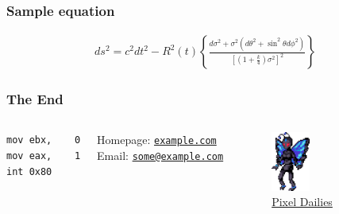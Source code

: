 \documentclass[10pt]{beamer}
\begin{document}
\begin{frame}
\frametitle{Sample equation}
\begin{gather}\label{eq:1}
ds^2=c^2dt^2-R^2(t)\left\{\frac{d\sigma^2+\sigma^2(d\theta^2+\sin^2\theta d\phi^2)}
    {\left[(1+\frac{k}{4})\sigma^2\right]^2}\right\}\:
\end{gather}
\end{frame}

\begin{frame}[fragile]
\frametitle{The End}
\begin{columns}

\begin{verbatim}
mov ebx,    0
mov eax,    1
int 0x80
\end{verbatim}
\par
\vspace{2em}
Homepage: \href{http://example.com}{\tt example.com}\\
Email: \href{mailto:some@example.com}{\tt some@example.com}

\begin{figure}[ht]
    \includegraphics[width=0.4\textwidth]{insect.png}
    \caption{\href{https://twitter.com/Pixel_Dailies}{Pixel Dailies}}
\end{figure}
\end{columns}
\end{frame}  
\end{document}

